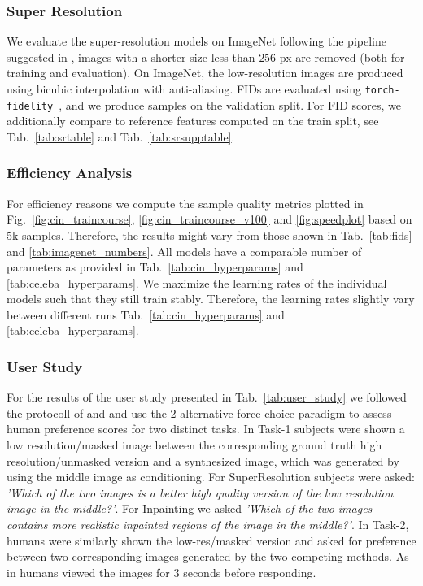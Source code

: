 \documentclass[10pt,twocolumn,letterpaper]{article}
\begin{document}
\subsubsection{Super Resolution}
\label{suppsubsubsec:sr}
We evaluate the super-resolution models on ImageNet following the pipeline suggested in \cite{DBLP:journals/corr/abs-2104-07636}, \ie images 
with a shorter size less than $256$ px are removed (both for training and evaluation). On ImageNet, the low-resolution images are 
produced using bicubic interpolation with anti-aliasing.
FIDs are evaluated using \texttt{torch-fidelity}~\cite{obukhov2020torchfidelity}, 
and we produce samples on the validation split.
For FID scores, we additionally compare to reference features computed on the train split, see Tab.~\ref{tab:srtable} and Tab.~\ref{tab:srsupptable}.


\subsubsection{Efficiency Analysis}
\label{suppsubsubsec:compute}
For efficiency reasons we compute the sample quality metrics plotted in Fig.~\ref{fig:cin_traincourse}, \ref{fig:cin_traincourse_v100} and \ref{fig:speedplot} based on 5k samples. Therefore, the results might vary from those shown in Tab.~\ref{tab:fids} and \ref{tab:imagenet_numbers}. All models have a comparable number of parameters as provided in Tab.~\ref{tab:cin_hyperparams} and \ref{tab:celeba_hyperparams}. We maximize the learning rates of the individual models such that they still train stably. Therefore, the learning rates slightly vary between different runs \cf Tab.~\ref{tab:cin_hyperparams} and \ref{tab:celeba_hyperparams}. 

\subsubsection{User Study}
\label{suppsubsubsec:user_study}
For the results of the user study presented in Tab.~\ref{tab:user_study} we followed the protocoll of \cite{DBLP:journals/corr/abs-2104-07636} and and use the 2-alternative force-choice paradigm to assess human preference scores for two distinct tasks. In Task-1 subjects were shown a low resolution/masked image between the corresponding ground truth high resolution/unmasked version and a synthesized image, which was generated by using the middle image as conditioning. For SuperResolution subjects were asked: \emph{'Which of the two images is a better high quality version of the low resolution image in the middle?'}. For Inpainting we asked \emph{'Which of the two images contains more realistic inpainted regions of the image in the middle?'}. In Task-2, humans were similarly shown the low-res/masked version and asked for preference between two corresponding images generated by the two competing methods. As in \cite{DBLP:journals/corr/abs-2104-07636} humans viewed the images for 3 seconds before responding.
\end{document}
